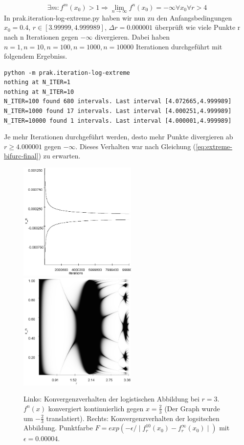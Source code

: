 \documentclass{scrartcl}
\begin{document}
\begin{equation}
\exists m : f^m(x_0) > 1 \Rightarrow
\lim_{n \rightarrow \infty} f^n(x_0) = -\infty \forall x_0 \forall r > 4
\label{eq:extreme-bifurc-final}
\end{equation}
In prak.iteration-log-extreme.py haben wir nun zu den Anfangsbedingungen $x_0=0.4$, $r \in [3.99999, 4.999989]$, $\Delta r = 0.000001$ überprüft wie viele Punkte r nach n Iterationen gegen $-\infty$ divergieren. Dabei haben $n=1, n=10, n=100, n=1000, n=10000$ Iterationen durchgeführt mit folgendem Ergebniss.

\begin{lstlisting}
python -m prak.iteration-log-extreme
nothing at N_ITER=1
nothing at N_ITER=10
N_ITER=100 found 680 intervals. Last interval [4.072665,4.999989]
N_ITER=1000 found 17 intervals. Last interval [4.000251,4.999989]
N_ITER=10000 found 1 intervals. Last interval [4.000001,4.999989]
\end{lstlisting}

Je mehr Iterationen durchgeführt werden, desto mehr Punkte divergieren ab $r \geq 4.000001$ gegen $-\infty$. Dieses Verhalten war nach Gleichung (\ref{eq:extreme-bifurc-final}) zu erwarten. 
\begin{figure}
\centering
\includegraphics[height=220px]{bifurkpunkt}
\includegraphics[height= 220px]{log-bifurk-xr}
\caption{Links: Konvergenzverhalten der logistischen Abbildung bei $r=3$. $f^n(x)$ konvergiert kontinuierlich gegen $x=\frac{2}{3}$ (Der Graph wurde um $-\frac{2}{3}$ translatiert). Rechts: Konvergenzverhalten der logsitschen Abbildung. Punktfarbe $F=exp(-\epsilon / \mid f^{10}_r(x_0)-f^{\infty}_r(x_0) \mid)$ mit $\epsilon=0.00004$.}
\label{fig:log-konv1}
\end{figure}
\end{document}
